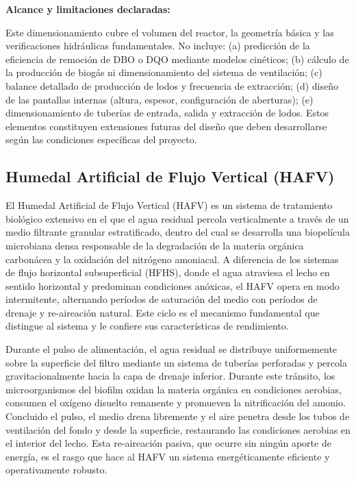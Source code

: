 \documentclass[12pt,a4paper]{article}
\begin{document}
\textbf{Alcance y limitaciones declaradas:}

Este dimensionamiento cubre el volumen del reactor, la geometría básica y las verificaciones hidráulicas fundamentales. No incluye: (a) predicción de la eficiencia de remoción de DBO o DQO mediante modelos cinéticos; (b) cálculo de la producción de biogás ni dimensionamiento del sistema de ventilación; (c) balance detallado de producción de lodos y frecuencia de extracción; (d) diseño de las pantallas internas (altura, espesor, configuración de aberturas); (e) dimensionamiento de tuberías de entrada, salida y extracción de lodos. Estos elementos constituyen extensiones futuras del diseño que deben desarrollarse según las condiciones específicas del proyecto.

\subsection{Humedal Artificial de Flujo Vertical (HAFV)}




El Humedal Artificial de Flujo Vertical (HAFV) es un sistema de tratamiento biológico extensivo en el que el agua residual percola verticalmente a través de un medio filtrante granular estratificado, dentro del cual se desarrolla una biopelícula microbiana densa responsable de la degradación de la materia orgánica carbonácea y la oxidación del nitrógeno amoniacal. A diferencia de los sistemas de flujo horizontal subsuperficial (HFHS), donde el agua atraviesa el lecho en sentido horizontal y predominan condiciones anóxicas, el HAFV opera en modo intermitente, alternando períodos de saturación del medio con períodos de drenaje y re-aireación natural. Este ciclo es el mecanismo fundamental que distingue al sistema y le confiere sus características de rendimiento.

Durante el pulso de alimentación, el agua residual se distribuye uniformemente sobre la superficie del filtro mediante un sistema de tuberías perforadas y percola gravitacionalmente hacia la capa de drenaje inferior. Durante este tránsito, los microorganismos del biofilm oxidan la materia orgánica en condiciones aerobias, consumen el oxígeno disuelto remanente y promueven la nitrificación del amonio. Concluido el pulso, el medio drena libremente y el aire penetra desde los tubos de ventilación del fondo y desde la superficie, restaurando las condiciones aerobias en el interior del lecho. Esta re-aireación pasiva, que ocurre sin ningún aporte de energía, es el rasgo que hace al HAFV un sistema energéticamente eficiente y operativamente robusto.
\end{document}
